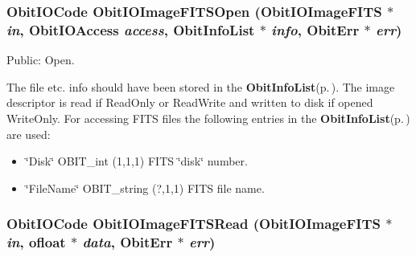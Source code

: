 \subsubsection{\setlength{\rightskip}{0pt plus 5cm}Obit\-IOCode Obit\-IOImage\-FITSOpen ({\bf Obit\-IOImage\-FITS} $\ast$ {\em in}, Obit\-IOAccess {\em access}, {\bf Obit\-Info\-List} $\ast$ {\em info}, {\bf Obit\-Err} $\ast$ {\em err})}\label{ObitIOImageFITS_8h_a11}


Public: Open. 

The file etc. info should have been stored in the {\bf Obit\-Info\-List}{\rm (p.\,\pageref{structObitInfoList})}. The image descriptor is read if Read\-Only or Read\-Write and written to disk if opened Write\-Only. For accessing FITS files the following entries in the {\bf Obit\-Info\-List}{\rm (p.\,\pageref{structObitInfoList})} are used: \begin{itemize}
\item \char`\"{}Disk\char`\"{} OBIT\_\-int (1,1,1) FITS \char`\"{}disk\char`\"{} number. \item \char`\"{}File\-Name\char`\"{} OBIT\_\-string (?,1,1) FITS file name. 
\end{itemize}
\subsubsection{\setlength{\rightskip}{0pt plus 5cm}Obit\-IOCode Obit\-IOImage\-FITSRead ({\bf Obit\-IOImage\-FITS} $\ast$ {\em in}, {\bf ofloat} $\ast$ {\em data}, {\bf Obit\-Err} $\ast$ {\em err})}\label{ObitIOImageFITS_8h_a14}


